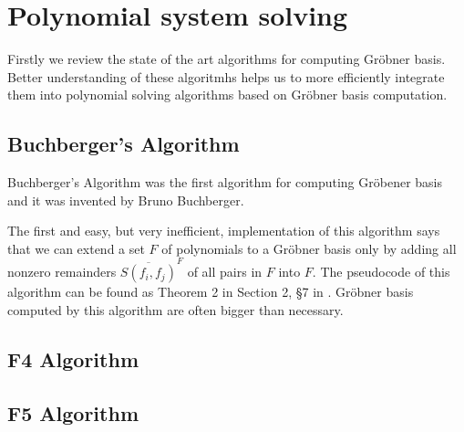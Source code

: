 \chapter{Polynomial system solving}
Firstly we review the state of the art algorithms for computing Gr\"obner basis. Better understanding of these algoritmhs helps us to more efficiently integrate them into polynomial solving algorithms based on Gr\"obner basis computation.

\section{Buchberger's Algorithm}
Buchberger's Algorithm was the first algorithm for computing Gr\"obener basis and it was invented by Bruno Buchberger.

The first and easy, but very inefficient, implementation of this algorithm says that we can extend a set $F$ of polynomials to a Gr\"obner basis only by adding all nonzero remainders $\overline{S(f_i, f_j)}^F$ of all pairs in $F$ into $F$.  The pseudocode of this algorithm can be found as Theorem 2 in Section 2, \S 7 in \cite{Cox-Little-Shea97}. Gr\"obner basis computed by this algorithm are often bigger than necessary.

\section{F4 Algorithm}

\section{F5 Algorithm}

